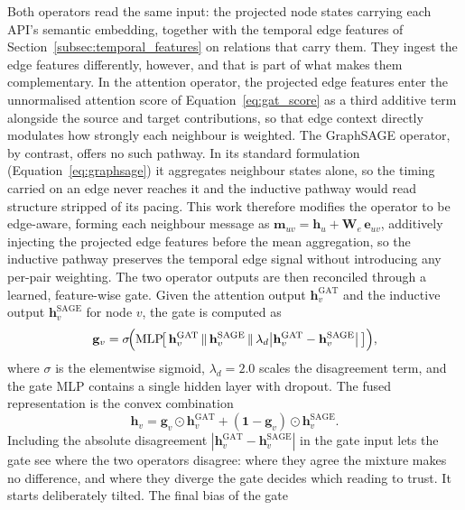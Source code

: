 \documentclass[%
    BCOR=10mm,
    DIV=13,
    toc=bibliography,
    toc=listof,
    oneside,
    12pt,
]{scrbook}
\begin{document}
Both operators read the same input: the projected node states carrying each
API's semantic embedding, together with the temporal edge features of
Section~\ref{subsec:temporal_features} on relations that carry them. They
ingest the edge features differently, however, and that is part of what makes
them complementary. In the attention operator, the projected edge features enter
the unnormalised attention score of Equation~\ref{eq:gat_score} as a third
additive term alongside the source and target contributions, so that edge
context directly modulates how strongly each neighbour is weighted. The
GraphSAGE operator, by contrast, offers no such pathway. In its standard
formulation (Equation~\ref{eq:graphsage}) it aggregates neighbour states
alone, so the timing carried on an edge never reaches it and the inductive
pathway would read structure stripped of its pacing. This work therefore
modifies the operator to be edge-aware, forming each neighbour message as
$\mathbf{m}_{uv} = \mathbf{h}_u + \mathbf{W}_e\,\mathbf{e}_{uv}$, additively
injecting the projected edge features before the mean aggregation, so the
inductive pathway preserves the temporal edge signal without introducing any
per-pair weighting. The two operator outputs are then reconciled through a
learned, feature-wise gate. Given the attention output
$\mathbf{h}^{\mathrm{GAT}}_v$ and the inductive output
$\mathbf{h}^{\mathrm{SAGE}}_v$ for node $v$, the gate is computed as
\begin{equation} \mathbf{g}_v = \sigma\!\Bigl( \mathrm{MLP}\!\bigl[\,
\mathbf{h}^{\mathrm{GAT}}_v \,\|\, \mathbf{h}^{\mathrm{SAGE}}_v \,\|\,
\lambda_d \bigl|\mathbf{h}^{\mathrm{GAT}}_v -
\mathbf{h}^{\mathrm{SAGE}}_v\bigr| \,\bigr]\Bigr), \label{eq:hybrid_gate}
\end{equation} where $\sigma$ is the elementwise sigmoid, $\lambda_d = 2.0$
scales the disagreement term, and the gate MLP contains a single hidden layer
with dropout. The fused representation is the convex combination
\begin{equation} \mathbf{h}_v = \mathbf{g}_v \odot \mathbf{h}^{\mathrm{GAT}}_v
+ (\mathbf{1} - \mathbf{g}_v) \odot \mathbf{h}^{\mathrm{SAGE}}_v.
\label{eq:hybrid_fuse} \end{equation} Including the absolute disagreement
$|\mathbf{h}^{\mathrm{GAT}}_v - \mathbf{h}^{\mathrm{SAGE}}_v|$ in the gate
input lets the gate see where the two operators disagree: where they agree the
mixture makes no difference, and where they diverge the gate decides which
reading to trust. It starts deliberately tilted. The final bias of the gate
\end{document}
